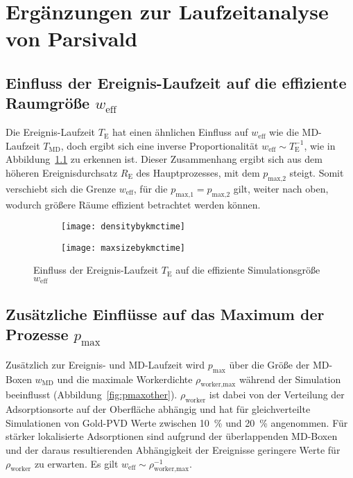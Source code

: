 \chapter{Ergänzungen zur Laufzeitanalyse von Parsivald}
\label{appendix_runtime}

\section{Einfluss der Ereignis-Laufzeit auf die effiziente Raumgröße \texorpdfstring{$w_\text{eff}$}{weff}}

Die Ereignis-Laufzeit $T_\text{E}$ hat einen ähnlichen Einfluss auf $w_\text{eff}$ wie die MD-Laufzeit $T_\text{MD}$, doch ergibt sich eine inverse Proportionalität $w_\text{eff} \sim T_\text{E}^{-1}$, wie in Abbildung~\ref{fig:weffeventtime} zu erkennen ist.
Dieser Zusammenhang ergibt sich aus dem höheren Ereignisdurchsatz $R_\text{E}$ des Hauptprozesses, mit dem $p_\text{max,2}$ steigt.
Somit verschiebt sich die Grenze $w_\text{eff}$, für die $p_\text{max,1} = p_\text{max,2}$ gilt, weiter nach oben, wodurch größere Räume effizient betrachtet werden können.

\begin{figure}[p]

  \captionsetup[subfigure]{singlelinecheck=false}
  \def\subfigwidth{7cm}
  \begin{subfigure}[t]{\subfigwidth}
    \texttt{[image: densitybykmctime]}
  \end{subfigure}
  \hfill
  \begin{subfigure}[t]{\subfigwidth}
    \texttt{[image: maxsizebykmctime]}
  \end{subfigure}

  \caption{Einfluss der Ereignis-Laufzeit $T_\text{E}$ auf die effiziente Simulationsgröße $w_\text{eff}$}
  \label{fig:weffeventtime}

\end{figure}

\section{Zusätzliche Einflüsse auf das Maximum der Prozesse \texorpdfstring{$p_\text{max}$}{pmax}}

Zusätzlich zur Ereignis- und MD-Laufzeit wird $p_\text{max}$ über die Größe der MD-Boxen $w_\text{MD}$ und die maximale Workerdichte $\rho_\text{worker,max}$ während der Simulation beeinflusst (Abbildung~\ref{fig:pmaxother}).
$\rho_\text{worker}$ ist dabei von der Verteilung der Adsorptionsorte auf der Oberfläche abhängig und hat für gleichverteilte Simulationen von Gold-PVD Werte zwischen \SI{10}{\percent} und \SI{20}{\percent} angenommen.
Für stärker lokalisierte Adsorptionen sind aufgrund der überlappenden MD-Boxen und der daraus resultierenden Abhängigkeit der Ereignisse geringere Werte für $\rho_\text{worker}$ zu erwarten.
Es gilt $w_\text{eff} \sim \rho_\text{worker,max}^{-1}$.


